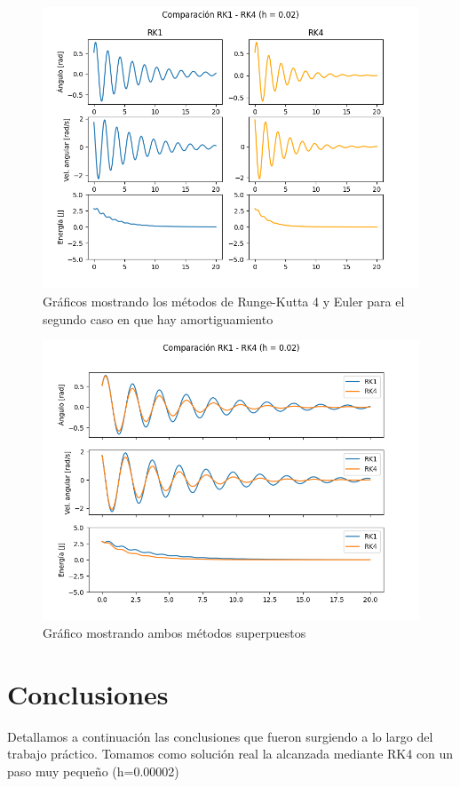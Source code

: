 \documentclass[titlepage,a4paper]{article}
\begin{document}
    \begin{figure}[H]
        \centering
        \includegraphics[scale = 0.4]{amortiguado1.png}
        \caption{Gráficos mostrando los métodos de Runge-Kutta 4 y Euler para el segundo caso en que hay amortiguamiento}
    \end{figure}
    
    \begin{figure}[H]
        \centering
        \includegraphics[scale = 0.4]{amortiguado2.png}
        \caption{Gráfico mostrando ambos métodos superpuestos}
    \end{figure}

\newpage

\section{Conclusiones}\label{sec:conclusiones}
    Detallamos a continuación las conclusiones que fueron surgiendo a lo largo del trabajo práctico. Tomamos como solución real la alcanzada mediante RK4 con un paso muy pequeño (h=0.00002)
    
\end{document}
